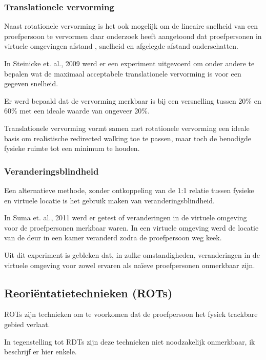 \documentclass[a4paper,12pt]{article}
\begin{document}
\subsubsection{Translationele vervorming}
Naast rotationele vervorming is het ook mogelijk om de lineaire snelheid van een
proefpersoon te vervormen daar onderzoek heeft aangetoond dat proefpersonen in 
virtuele omgevingen afstand \cite{loomis03}, snelheid \cite{banton05} en 
afgelegde afstand \cite{frenz07} onderschatten.

In Steinicke et. al., 2009 \cite{steinicke09} werd er een experiment uitgevoerd 
om onder andere te bepalen wat de maximaal acceptabele translationele vervorming 
is voor een gegeven snelheid.

Er werd bepaald dat de vervorming merkbaar is bij een versnelling tussen 20\% en
60\% met een ideale waarde van ongeveer 20\%.

Translationele vervorming vormt samen met rotationele vervorming een ideale basis 
om realistische redirected walking toe te passen, maar toch de benodigde fysieke 
ruimte tot een minimum te houden.


\subsubsection{Veranderingsblindheid}
Een alternatieve methode, zonder ontkoppeling van de 1:1 relatie tussen fysieke 
en virtuele locatie is het gebruik maken van veranderingsblindheid.

In Suma et. al., 2011 \cite{suma11} werd er getest of veranderingen in de 
virtuele omgeving voor de proefpersonen merkbaar waren. In een virtuele omgeving 
werd de locatie van de deur in een kamer veranderd zodra de proefpersoon weg 
keek.

Uit dit experiment is gebleken dat, in zulke omstandigheden, veranderingen in de
virtuele omgeving voor zowel ervaren als na\"ieve proefpersonen onmerkbaar zijn.


\subsection{Reori\"entatietechnieken (ROTs)}
ROTs zijn technieken om te voorkomen dat de proefpersoon het fysiek trackbare 
gebied verlaat.

In tegenstelling tot RDTs zijn deze technieken niet noodzakelijk onmerkbaar, ik
beschrijf er hier enkele.
\end{document}
